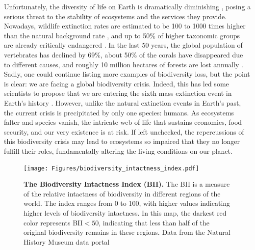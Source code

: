 Unfortunately, the diversity of life on Earth is dramatically diminishing
\cite{Hughes1997,Ceballos2002,Pereira2010}, posing a serious threat to the
stability of ecosystems and the services they provide. Nowadays, wildlife
extinction rates are estimated to be 100 to 1000 times higher than the natural
background rate \cite{Ceballos2015,Pimm2014}, and up to 50\% of higher
taxonomic groups are already critically endangered \cite{Smith2009}. In the
last 50 years, the global population of vertebrates has declined by 69\%, about
50\% of the corals have disappeared due to different causes, and roughly 10
million hectares of forests are lost annually \cite{WWF2022}. Sadly, one could
continue listing more examples of biodiversity loss, but the point is clear: we
are facing a global biodiversity crisis. Indeed, this has led some scientists
to propose that we are entering the sixth mass extinction event in Earth's
history \cite{Barnosky2011}. However, unlike the natural extinction events in
Earth’s past, the current crisis is precipitated by only one species: humans.
As ecosystems falter and species vanish, the intricate web of life that
sustains economies, food security, and our very existence is at risk. If left
unchecked, the repercussions of this biodiversity crisis may lead to ecosystems
so impaired that they no longer fulfill their roles, fundamentally altering the
living conditions on our planet.

\begin{figure}[H]
  \centering
  \texttt{[image: Figures/biodiversity\_intactness\_index.pdf]}
  \caption[The Biodiversity Intactness
    Index]{\label{fig:biodiversity_intactness_index} \textbf{The Biodiversity
      Intactness Index (BII).} The BII is a measure of the relative intactness
    of biodiversity in	different regions of the world. The index ranges from 0
    to 100, with higher values indicating higher levels of biodiversity
    intactness. In this map, the darkest red color represents BII$<50$,
    indicating that less than half of the original biodiversity remains in
    these regions. Data from the Natural History Museum data portal
    \cite{Newbold2016}}
\end{figure}

